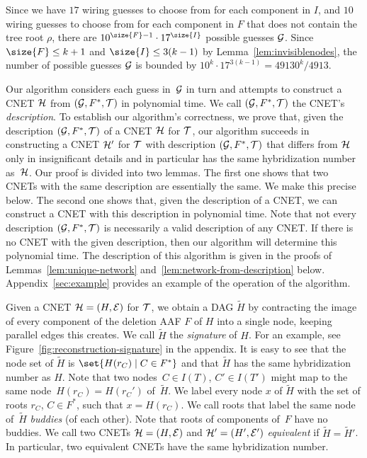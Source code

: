 Since we have $17$ wiring guesses to choose from for each component in $I$,
and $10$ wiring guesses to choose from for each component in $F$ that does not
contain the tree root $\rho$, there are $10^{\size{F}-1} \cdot 17^{\size{I}}$
possible guesses $\mathcal{G}$.
Since $\size{F} \le k+1$ and $\size{I} \le 3(k-1)$ by Lemma~\ref{lem:invisiblenodes}, the number of possible guesses $\mathcal{G}$ is bounded
by $10^k \cdot 17^{3(k-1)} = 49130^k / 4913$.

Our algorithm considers each guess {in}~$\mathcal{G}$ in turn and attempts to construct a
CNET $\mathcal{H}$ from $(\mathcal{G}, F^*, \mathcal{T})$ in polynomial time.
We call $(\mathcal{G}, F^*, \mathcal{T})$ the CNET's \emph{description}.
To establish our algorithm's correctness, we prove that, given the description
$(\mathcal{G}, F^*, \mathcal{T})$ of a CNET $\mathcal{H}$ for $\mathcal{T}$, our
algorithm succeeds in constructing a CNET $\mathcal{H}'$ for
$\mathcal{T}$ with description $(\mathcal{G}, F^*, \mathcal{T})$ that differs from $\mathcal{H}$ only in
insignificant details and in particular has the same hybridization number
as~$\mathcal{H}$. Our proof is divided into two lemmas. The first one shows that two CNETs with the same description are essentially
the same.
We make this precise below.
The second one shows that, given the description of a CNET, we can construct a CNET with this description in polynomial time.
Note that not every description $(\mathcal{G}, F^*, \mathcal{T})$ is necessarily a valid
description of any CNET.
{If there is no CNET with the given description, then our algorithm will determine this polynomial time.} The description of this algorithm is given in the proofs of
Lemmas~\ref{lem:unique-network} and~\ref{lem:network-from-description} below.
Appendix~\ref{sec:example} provides an example of the operation of the
algorithm.

Given a CNET $\mathcal{H} = (H, \mathcal{E})$ for $\mathcal{T}$, we obtain a DAG $\tilde H$ by contracting the image of every component of the deletion AAF $F$ of $H$ into a single node, keeping parallel edges this creates. We call $\tilde H$ the \emph{signature} of $H$. {For an example, see Figure~\ref{fig:reconstruction-signature} in the appendix.} It is easy to see that the node set of $\tilde H$ is $\set{H(r_C) \mid C \in F^*}$ and that $\tilde H$ has the same hybridization number as $H$. Note that two nodes~$C\in I(T)$, $C'\in I(T')$ might map to the same node~$H(r_C)=H(r{_C'})$ of~$\tilde H$. We label every node $x$ of $\tilde H$ with the set of roots $r_C$, $C \in F^*$, such that $x = H(r_C)$. We call roots that label the same node of~$\tilde H$ \emph{buddies} (of each other). Note that roots of components of~$F$ have no buddies. We call two CNETs $\mathcal{H} = (H, \mathcal{E})$ and $\mathcal{H}' = (H', \mathcal{E}')$ \emph{equivalent} if $\tilde H = \tilde H'$. In particular, two equivalent CNETs have the same hybridization number. 

